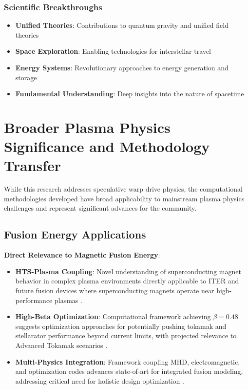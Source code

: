 \documentclass[12pt,a4paper]{article}
\begin{document}
\subsubsection{Scientific Breakthroughs}
\begin{itemize}
\item \textbf{Unified Theories}: Contributions to quantum gravity and unified field theories
\item \textbf{Space Exploration}: Enabling technologies for interstellar travel
\item \textbf{Energy Systems}: Revolutionary approaches to energy generation and storage
\item \textbf{Fundamental Understanding}: Deep insights into the nature of spacetime
\end{itemize}

\section{Broader Plasma Physics Significance and Methodology Transfer}

While this research addresses speculative warp drive physics, the computational methodologies developed have broad applicability to mainstream plasma physics challenges and represent significant advances for the community.

\subsection{Fusion Energy Applications}

\textbf{Direct Relevance to Magnetic Fusion Energy}:
\begin{itemize}
\item \textbf{HTS-Plasma Coupling}: Novel understanding of superconducting magnet behavior in complex plasma environments directly applicable to ITER and future fusion devices where superconducting magnets operate near high-performance plasmas \cite{senatore2014progress,wesson2011tokamaks}.
\item \textbf{High-Beta Optimization}: Computational framework achieving $\beta = 0.48$ suggests optimization approaches for potentially pushing tokamak and stellarator performance beyond current limits, with projected relevance to Advanced Tokamak scenarios \cite{Plasma2023}.
\item \textbf{Multi-Physics Integration}: Framework coupling MHD, electromagnetic, and optimization codes advances state-of-art for integrated fusion modeling, addressing critical need for holistic design optimization \cite{PlasmaPhysics2023}.
\end{itemize}
\end{document}
